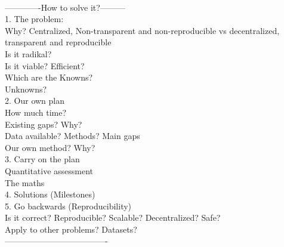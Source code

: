 \documentclass[english,12pt]{article}
\begin{document}
\begin{mybox}\begin{singlespace}
 {\bf{}}\\
 \begin{small}
-------------How to solve it?---------\\
1. The problem:\\
       Why? Centralized, Non-transparent and non-reproducible vs decentralized, transparent and reproducible\\
       Is it radikal?\\
       Is it viable? Efficient?\\
       Which are the Knowns?\\
       Unknowns? \\
2. Our own plan\\
       How much time?\\
       Existing gaps? Why?\\
       Data available? Methods? Main gaps\\
       Our own method? Why?\\
3. Carry on the plan\\
       Quantitative assessment\\
       The maths\\ 
4. Solutions (Milestones) \\
5. Go backwards (Reproducibility)\\
   Is it correct? Reproducible? Scalable? Decentralized? Safe?\\
   Apply to other problems? Datasets?\\
-------------------------------------
\end{small}
\end{singlespace}
\end{mybox}

\newpage

%
\end{document}
